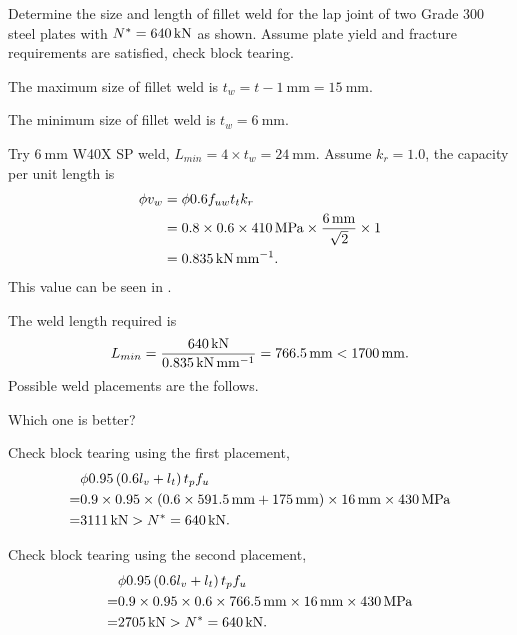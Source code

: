\begin{exmp} Determine the size and length of fillet weld for the lap joint of two Grade 300 steel plates with $N^*=\SI{640}{\kilo\newton}$ as shown. Assume plate yield and fracture requirements are satisfied, check block tearing.
\begin{figure}[H]

\end{figure}
\end{exmp}
\begin{solution}
The maximum size of fillet weld is $t_w=t-\SI{1}{\mm}=\SI{15}{\mm}$.

The minimum size of fillet weld is $t_w=\SI{6}{\mm}$.

Try $\SI{6}{\mm}$ W40X SP weld, $L_{min}=4\times{}t_w=\SI{24}{\mm}$. Assume $k_r=1.0$, the capacity per unit length is
\begin{align*}
\phi{}v_w&=\phi{}0.6f_{uw}t_tk_r\\
&=0.8\times0.6\times\SI{410}{\mega\pascal}\times\dfrac{\SI{6}{\milli\meter}}{\sqrt{2}}\times1\\
&=\SI{0.835}{\kilo\newton\per\milli\meter}.
\end{align*}
This value can be seen in .

The weld length required is
\begin{gather*}
L_{min}=\dfrac{\SI{640}{\kilo\newton}}{\SI{0.835}{\kilo\newton\per\milli\meter}}=\SI{766.5}{\milli\meter}<\SI{1700}{\milli\meter}.
\end{gather*}
Possible weld placements are the follows.
\begin{figure}[H]
\centering

\end{figure}
Which one is better?

Check block tearing using the first placement,
\begin{align*}
&\phi0.95\left(0.6l_{v}+l_{t}\right)t_pf_u\\=&0.9\times0.95\times\left(0.6\times\SI{591.5}{\milli\meter}+\SI{175}{\milli\meter}\right)\times\SI{16}{\milli\meter}\times\SI{430}{\mega\pascal}
\\=&\SI{3111}{\kilo\newton}>N^*=\SI{640}{\kilo\newton}.
\end{align*}

Check block tearing using the second placement,
\begin{align*}
&\phi0.95\left(0.6l_{v}+l_{t}\right)t_pf_u\\=&0.9\times0.95\times0.6\times\SI{766.5}{\milli\meter}\times\SI{16}{\milli\meter}\times\SI{430}{\mega\pascal}
\\=&\SI{2705}{\kilo\newton}>N^*=\SI{640}{\kilo\newton}.
\end{align*}
\end{solution}
